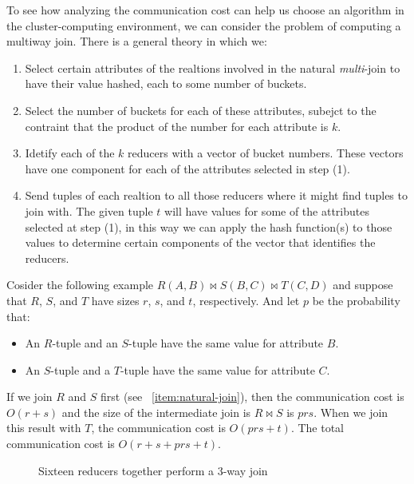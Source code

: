 To see how analyzing the communication cost can help us choose an algorithm in the cluster-computing environment, we can consider the problem of computing a multiway join. There is a general theory in which we:
\begin{enumerate}
    \item Select certain attributes of the realtions involved in the natural \textit{multi}-join to have their value hashed, each to some number of buckets.
    \item Select the number of buckets for each of these attributes, subejct to the contraint that the product of the number for each attribute is $k$.
    \item Idetify each of the $k$ reducers with a vector of bucket numbers. These vectors have one component for each of the attributes selected in step (1).
    \item Send tuples of each realtion to all those reducers where it might find tuples to join with. The given tuple $t$ will have values for some of the attributes selected at step (1), in this way we can apply the hash function(s) to those values to determine certain components of the vector that identifies the reducers. 
\end{enumerate}
Cosider the following example $R(A, B) \bowtie S(B, C) \bowtie T(C, D)$ and suppose that $R$, $S$, and $T$ have sizes $r$, $s$, and $t$, respectively. And let $p$ be the probability that:
\begin{itemize}
    \item An $R$-tuple and an $S$-tuple have the same value for attribute $B$.
    \item An $S$-tuple and a $T$-tuple have the same value for attribute $C$.
\end{itemize}
If we join $R$ and $S$ first (see ~\ref{item:natural-join}), then the communication cost is $O(r+s)$ and the size of the intermediate join is $R \bowtie S$ is $prs$. When we join this result with $T$, the communication cost is $O(prs+t)$. The total communication cost is $O(r+s+prs+t)$. 

\begin{figure}[H]
\centering
\scalebox{1}{
    
}
\caption{Sixteen reducers together perform a 3-way join}
\label{fig:3-way-join}
\end{figure}

\newpage
\begin{figure}[H]
\centering
\scalebox{1}{
    
}
\end{figure}
